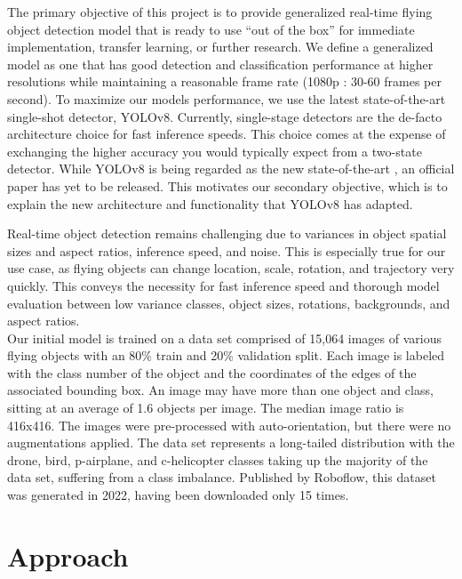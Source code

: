 \documentclass[10pt,twocolumn,letterpaper]{article}
\begin{document}
The primary objective of this project is to provide generalized real-time flying object detection model that is ready to use ``out of the box'' for immediate implementation, transfer learning, or further research. We define a generalized model as one that has good detection and classification performance at higher resolutions while maintaining a reasonable frame rate (1080p : 30-60 frames per second). To maximize our models performance, we use the latest state-of-the-art single-shot detector, YOLOv8. Currently, single-stage detectors are the de-facto architecture choice for fast inference speeds. This choice comes at the expense of exchanging the higher accuracy you would typically expect from a two-state detector. While YOLOv8 is being regarded as the new state-of-the-art \cite{state-of-the-art}, an official paper has yet to be released. This motivates our secondary objective, which is to explain the new architecture and functionality that YOLOv8 has adapted. 

Real-time object detection remains challenging due to variances in object spatial sizes and aspect ratios, inference speed, and noise. This is especially true for our use case, as flying objects can change location, scale, rotation, and trajectory very quickly. This conveys the necessity for fast inference speed and thorough model evaluation between low variance classes, object sizes, rotations, backgrounds, and aspect ratios.
\\
Our initial model is trained on a data set comprised of 15,064 images of various flying objects with an 80\% train and 20\% validation split. Each image is labeled with the class number of the object and the coordinates of the edges of the associated bounding box. An image may have more than one object and class, sitting at an average of 1.6 objects per image. The median image ratio is 416x416. The images were pre-processed with auto-orientation, but there were no augmentations applied. The data set represents a long-tailed distribution with the drone, bird, p-airplane, and c-helicopter classes taking up the majority of the data set, suffering from a class imbalance. Published by Roboflow, this dataset was generated in 2022, having been downloaded only 15 times.
\section{Approach}
\end{document}
